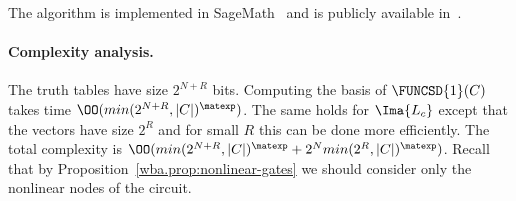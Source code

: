 
The algorithm is implemented in SageMath~\cite{sage} and is publicly available in~\cite{OurWhiteboxCode}.

\paragraph{Complexity analysis.}
The truth tables have size $2^{N+R}$ bits. Computing the basis of $\FUNCSD{1}(C)$ takes time $\OO(min(2^{N+R}, |C|)^\matexp)$. The same holds for $\Ima{L_c}$ except that the vectors have size $2^{R}$ and for small $R$ this can be done more efficiently. The total complexity is $\OO(min(2^{N+R}, |C|)^\matexp + 2^N min(2^{R}, |C|)^\matexp)$. Recall that by Proposition~\ref{wba.prop:nonlinear-gates} we should consider only the nonlinear nodes of the circuit. 


